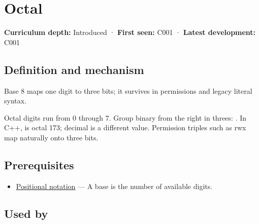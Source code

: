 \hypertarget{appendix-17fc1bc8b305}{}\label{referencestart:appendix-17fc1bc8b305}
\section{Octal}\label{appendix-17fc1bc8b305-octal}

\hypertarget{appendix-17fc1bc8b305-octal}{}

\textbf{Curriculum depth:} Introduced · \textbf{First seen:} C001 · \textbf{Latest development:} C001

\begin{allmightroledefinition}

\subsection{Definition and mechanism}\label{appendix-17fc1bc8b305-definition-and-mechanism}

\hypertarget{appendix-17fc1bc8b305-definition-and-mechanism}{}

Base 8 maps one digit to three bits; it survives in permissions and legacy literal syntax.

\end{allmightroledefinition}

Octal digits run from 0 through 7. Group binary from the right in threes: . In C++,  is octal 173; decimal  is a different value. Permission triples such as rwx map naturally onto three bits.

\subsection{Prerequisites}\label{appendix-17fc1bc8b305-prerequisites}

\hypertarget{appendix-17fc1bc8b305-prerequisites}{}

\begin{itemize}
\tightlist
\item
  \hyperref[appendix-83c3f28f7bda]{Positional notation} --- A base is the number of available digits.
\end{itemize}

\subsection{Used by}\label{appendix-17fc1bc8b305-used-by}

